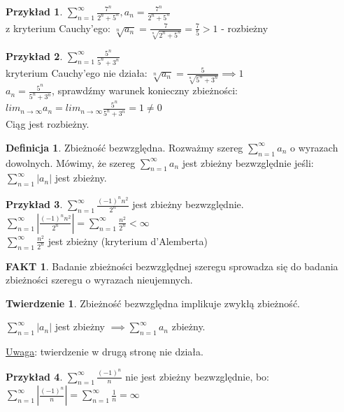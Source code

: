 \documentclass{article}
\theoremstyle{definition}
\newtheorem{de}{Definicja}[subsection]
\theoremstyle{definition}
\newtheorem{tw}{Twierdzenie}[subsection]
\theoremstyle{definition}
\newtheorem{pk}{Przykład}[subsection]
\theoremstyle{definition}
\newtheorem*{fakt}{FAKT}
\begin{document}
\begin{pk}
    $\sum_{n=1}^{\infty} \frac{7^n}{2^n+5^n}, a_n=\frac{7^n}{2^n+5^n}$\\
    z kryterium Cauchy'ego: $\sqrt[n]{a_n} = \frac{7}{\sqrt[n]{2^n+5^n}} = \frac{7}{5} > 1$ - rozbieżny
\end{pk}

\begin{pk}
    $\sum_{n=1}^{\infty} \frac{5^n}{5^n+3^n}$\\
    kryterium Cauchy'ego nie działa: $\sqrt[n]{a_n}=\frac{5}{\sqrt[n]{5^n+3^n}} \implies 1$\\
    $a_n=\frac{5^n}{5^n+3^n}$, sprawdźmy warunek konieczny zbieżności:\\
    $lim_{n\rightarrow \infty} a_n = lim_{n\rightarrow \infty} \frac{5^n}{5^n+3^n} = 1 \neq 0$\\
    Ciąg jest rozbieżny.
\end{pk}

\begin{de}
    Zbieżność bezwzględna. Rozważmy szereg $\sum_{n=1}^{\infty} a_n$ o wyrazach dowolnych. 
    Mówimy, że szereg $\sum_{n=1}^{\infty} a_n$ jest zbieżny bezwzględnie jeśli:
    $\sum_{n=1}^{\infty} |a_n|$ jest zbieżny.
\end{de}

\begin{pk}
    $\sum_{n=1}^{\infty} \frac{(-1)^n n^2}{2^n}$ jest zbieżny bezwzględnie.\\
    $\sum_{n=1}^{\infty} |\frac{(-1)^n n^2}{2^n}| = \sum_{n=1}^{\infty} \frac{n^2}{2^n} < \infty$\\
    $\sum_{n=1}^{\infty} \frac{n^2}{2^n}$ jest zbieżny (kryterium d'Alemberta)
\end{pk}

\begin{fakt}
    Badanie zbieżności bezwzględnej szeregu sprowadza się do badania zbieżności szeregu o wyrazach nieujemnych.
\end{fakt}

\begin{tw}
    Zbieżność bezwzględna implikuje zwykłą zbieżność.
    \begin{center}
        $\sum_{n=1}^{\infty} |a_n|$ jest zbieżny $\implies \sum_{n=1}^{\infty} a_n$ zbieżny.
    \end{center}
    \underline{Uwaga}: twierdzenie w drugą stronę nie działa.
\end{tw}

\begin{pk}
    $\sum_{n=1}^{\infty} \frac{(-1)^n}{n}$ nie jest zbieżny bezwzględnie, bo:\\
    $\sum_{n=1}^{\infty} \left|\frac{(-1)^n}{n}\right| = \sum_{n=1}^{\infty} \frac{1}{n} = \infty$\\
\end{pk}
\end{document}
